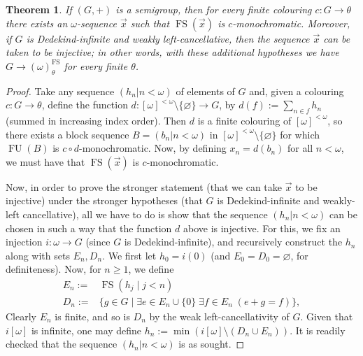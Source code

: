 \documentclass[10pt,a4paper]{amsart}
\newtheorem{theorem}{Theorem}[section]
\theoremstyle{definition}
\theoremstyle{remark}
\numberwithin{equation}{section}
\begin{document}
\begin{theorem}\label{fin-inf-hindman}
    If $(G, +)$ is a semigroup, then for every finite colouring \linebreak$c:G\longrightarrow\theta$ there exists an $\omega$-sequence $\vec{x}$ such that $\operatorname{FS}(\vec{x})$ is $c$-monochromatic. Moreover, if $G$ is Dedekind-infinite and weakly left-cancellative, then the sequence $\vec{x}$ can be taken to be injective; in other words, with these additional hypotheses we have $G\to(\omega)^{\operatorname{FS}}_{\theta}$ for every finite $\theta$.
\end{theorem}
\begin{proof}
    Take any sequence $(h_n\big|n<\omega)$ of elements of $G$ and, given a colouring $c:G\longrightarrow\theta$, define the function $d:[\omega]^{<\omega}\setminus\{\varnothing\}\to G$, by $d(f):=\sum_{n\in f}h_{n}$ (summed in increasing index order). Then $d$ is a finite colouring of $[\omega]^{<\omega}$, so there exists a block sequence $B=(b_{n}|n<\omega)$ in $[\omega]^{<\omega}\setminus\{\varnothing\}$ for which $\operatorname{FU}(B)$ is $c\circ d$-monochromatic. Now, by defining $x_n=d(b_{n})$ for all $n<\omega$, we must have that $\operatorname{FS}(\vec{x})$ is $c$-monochromatic.

    Now, in order to prove the stronger statement (that we can take $\vec{x}$ to be injective) under the stronger hypotheses (that $G$ is Dedekind-infinite and weakly-left cancellative), all we have to do is show that the sequence $(h_n\big|n<\omega)$ can be chosen in such a way that the function $d$ above is injective. For this, we fix an injection $i:\omega\to G$ (since $G$ is Dedekind-infinite), and recursively construct the $h_n$ along with sets $E_n,D_n$. We first let $h_0=i(0)$ (and $E_0=D_0=\varnothing$, for definiteness). Now, for $n\geq 1$, we define
%            
    \begin{align*}
        E_{n}:=&\operatorname{FS}(h_{j}\mid j<n)\\
                D_{n}:=&\{g\in G\mid\exists e\in E_{n}\cup\{0\}\;\exists f\in E_n\;(e+g=f)\big\},
    \end{align*}
    Clearly $E_{n}$ is finite, and so is $D_{n}$ by the weak left-cancellativity of $G$. Given that $i[\omega]$ is infinite, one may define $h_{n}:=\min(i[\omega]\setminus(D_{n}\cup E_{n}))$. It is readily checked that the sequence $(h_n\big|n<\omega)$ is as sought.
\qedhere
\end{proof}
\end{document}
